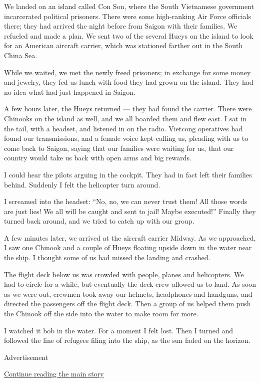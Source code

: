 We landed on an island called Con Son, where the South Vietnamese
government incarcerated political prisoners. There were some
high-ranking Air Force officials there; they had arrived the night
before from Saigon with their families. We refueled and made a plan. We
sent two of the several Hueys on the island to look for an American
aircraft carrier, which was stationed farther out in the South China
Sea.

While we waited, we met the newly freed prisoners; in exchange for some
money and jewelry, they fed us lunch with food they had grown on the
island. They had no idea what had just happened in Saigon.

A few hours later, the Hueys returned --- they had found the carrier.
There were Chinooks on the island as well, and we all boarded them and
flew east. I sat in the tail, with a headset, and listened in on the
radio. Vietcong operatives had found our transmissions, and a female
voice kept calling us, pleading with us to come back to Saigon, saying
that our families were waiting for us, that our country would take us
back with open arms and big rewards.

I could hear the pilots arguing in the cockpit. They had in fact left
their families behind. Suddenly I felt the helicopter turn around.

I screamed into the headset: ``No, no, we can never trust them! All
those words are just lies! We all will be caught and sent to jail! Maybe
executed!'' Finally they turned back around, and we tried to catch up
with our group.

A few minutes later, we arrived at the aircraft carrier Midway. As we
approached, I saw one Chinook and a couple of Hueys floating upside down
in the water near the ship. I thought some of us had missed the landing
and crashed.

The flight deck below us was crowded with people, planes and
helicopters. We had to circle for a while, but eventually the deck crew
allowed us to land. As soon as we were out, crewmen took away our
helmets, headphones and handguns, and directed the passengers off the
flight deck. Then a group of us helped them push the Chinook off the
side into the water to make room for more.

I watched it bob in the water. For a moment I felt lost. Then I turned
and followed the line of refugees filing into the ship, as the sun faded
on the horizon.

Advertisement

\protect\hyperlink{after-bottom}{Continue reading the main story}

